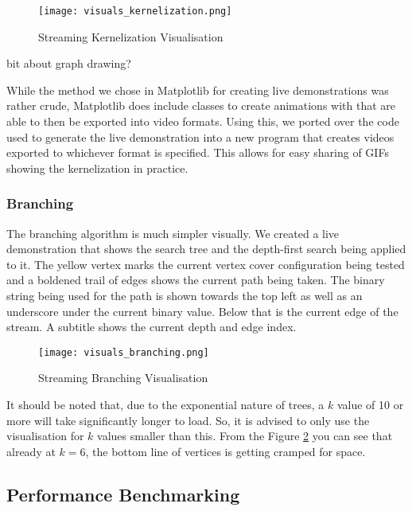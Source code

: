\begin{figure}[htb]
    \centering
    \texttt{[image: visuals\_kernelization.png]}
    \caption{Streaming Kernelization Visualisation}
    \label{fig:kernelization_visualisation}
\end{figure}

bit about graph drawing?

While the method we chose in Matplotlib for creating live demonstrations
was rather crude, Matplotlib does include classes to create animations
with that are able to then be exported into video formats. Using this,
we ported over the code used to generate the live demonstration into a
new program that creates videos exported to whichever format is
specified. This allows for easy sharing of GIFs showing the
kernelization in practice.

\subsubsection{Branching}

The branching algorithm is much simpler visually. We created a live
demonstration that shows the search tree and the depth-first search
being applied to it. The yellow vertex marks the current vertex cover
configuration being tested and a boldened trail of edges shows the
current path being taken. The binary string being used for the path is
shown towards the top left as well as an underscore under the current
binary value. Below that is the current edge of the stream. A subtitle
shows the current depth and edge index.

\begin{figure}[htb]
    \centering
    \texttt{[image: visuals\_branching.png]}
    \caption{Streaming Branching Visualisation}
    \label{fig:branching_visualisation}
\end{figure}

It should be noted that, due to the exponential nature of trees, a \(k\)
value of 10 or more will take significantly longer to load. So, it is
advised to only use the visualisation for \(k\) values smaller than
this. From the Figure \ref{fig:branching_visualisation} you can see that already at \(k=6\), the
bottom line of vertices is getting cramped for space.

\subsection{Performance Benchmarking}

